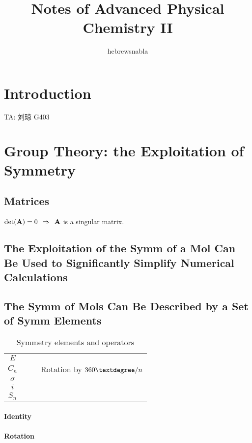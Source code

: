 \documentclass[a4paper]{article}
\title{Notes of \textbf{Advanced Physical Chemistry II}}
\author{hebrewsnabla}
\DeclareMathOperator{\dra}{\;\Rightarrow\;}
\numberwithin{equation}{section}
\begin{document}
\maketitle

\tableofcontents

\newpage


\section*{Introduction}
TA: 刘琼 G403

\setcounter{section}{11}
\section{Group Theory: the Exploitation of Symmetry}
\subsection*{Matrices}
$ \det(\vb{A}) = 0 \;\dra\; \vb{A} $ is a singular matrix.\\

\subsection{The Exploitation of the Symm of a Mol Can Be Used to Significantly Simplify Numerical Calculations}

\subsection{The Symm of Mols Can Be Described by a Set of Symm Elements}
\begin{table}[H]
	\centering
	\begin{tabular}{cccc}
		\hline
		$ E $ & & & \\
		$ C_n $ & & & Rotation by $ 360\textdegree/n $\\
		$ \sigma $ && &\\
		$ i $ &&&\\
		$ S_n $ &&&\\
		\hline
	\end{tabular}
    \caption{Symmetry elements and operators}
\end{table}
\paragraph{Identity}
\paragraph{Rotation}
\end{document}

